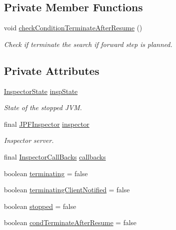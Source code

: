 \subsection*{Private Member Functions}
\begin{DoxyCompactItemize}
\item 
void \hyperlink{classgov_1_1nasa_1_1jpf_1_1inspector_1_1server_1_1jpf_1_1_stop_holder_ac97ffc05553690ab11cb985b42327f10}{check\+Condition\+Terminate\+After\+Resume} ()
\begin{DoxyCompactList}\small\item\em Check if terminate the search if forward step is planned. \end{DoxyCompactList}\end{DoxyCompactItemize}
\subsection*{Private Attributes}
\begin{DoxyCompactItemize}
\item 
\hyperlink{interfacegov_1_1nasa_1_1jpf_1_1inspector_1_1server_1_1expression_1_1_inspector_state}{Inspector\+State} \hyperlink{classgov_1_1nasa_1_1jpf_1_1inspector_1_1server_1_1jpf_1_1_stop_holder_a9fe94c33b32604112b8cf9bc0a72f401}{insp\+State}
\begin{DoxyCompactList}\small\item\em State of the stopped J\+VM. \end{DoxyCompactList}\item 
final \hyperlink{classgov_1_1nasa_1_1jpf_1_1inspector_1_1server_1_1jpf_1_1_j_p_f_inspector}{J\+P\+F\+Inspector} \hyperlink{classgov_1_1nasa_1_1jpf_1_1inspector_1_1server_1_1jpf_1_1_stop_holder_ad7eae9e53d25e2777d747423d71ddf0e}{inspector}
\begin{DoxyCompactList}\small\item\em Inspector server. \end{DoxyCompactList}\item 
final \hyperlink{interfacegov_1_1nasa_1_1jpf_1_1inspector_1_1interfaces_1_1_inspector_call_backs}{Inspector\+Call\+Backs} \hyperlink{classgov_1_1nasa_1_1jpf_1_1inspector_1_1server_1_1jpf_1_1_stop_holder_a0f6e1696842fdce668e4246c3344c240}{callbacks}
\item 
boolean \hyperlink{classgov_1_1nasa_1_1jpf_1_1inspector_1_1server_1_1jpf_1_1_stop_holder_aa7cffa6127510e49385ce5dce81b1878}{terminating} = false
\item 
boolean \hyperlink{classgov_1_1nasa_1_1jpf_1_1inspector_1_1server_1_1jpf_1_1_stop_holder_adacbde9669c7c438d8768d5b5f426715}{terminating\+Client\+Notified} = false
\item 
boolean \hyperlink{classgov_1_1nasa_1_1jpf_1_1inspector_1_1server_1_1jpf_1_1_stop_holder_ae8b0a8ec5e2dc3c3f38a8525ebcceb6b}{stopped} = false
\item 
boolean \hyperlink{classgov_1_1nasa_1_1jpf_1_1inspector_1_1server_1_1jpf_1_1_stop_holder_a9b9676b2b3ee74da118a76f7cab58760}{cond\+Terminate\+After\+Resume} = false
\end{DoxyCompactItemize}


